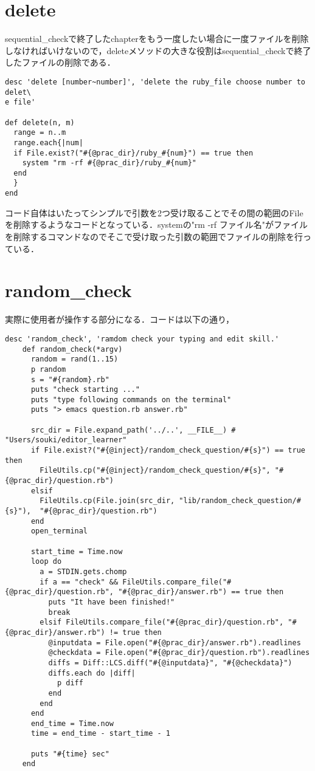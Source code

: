     \section{delete}\label{delete}

sequential\_checkで終了したchapterをもう一度したい場合に一度ファイルを削除しなければいけないので，deleteメソッドの大きな役割はsequential\_checkで終了したファイルの削除である．

\begin{verbatim}
desc 'delete [number~number]', 'delete the ruby_file choose number to delet\
e file'

def delete(n, m)
  range = n..m
  range.each{|num|
  if File.exist?("#{@prac_dir}/ruby_#{num}") == true then
    system "rm -rf #{@prac_dir}/ruby_#{num}"
  end
  }
end
\end{verbatim}

コード自体はいたってシンプルで引数を2つ受け取ることでその間の範囲のFileを削除するようなコードとなっている．systemの"rm
-rf
ファイル名"がファイルを削除するコマンドなのでそこで受け取った引数の範囲でファイルの削除を行っている．

    \section{random\_check}\label{random_check}

実際に使用者が操作する部分になる．コードは以下の通り，

\begin{verbatim}
desc 'random_check', 'ramdom check your typing and edit skill.'
    def random_check(*argv)
      random = rand(1..15)
      p random
      s = "#{random}.rb"
      puts "check starting ..."
      puts "type following commands on the terminal"
      puts "> emacs question.rb answer.rb"

      src_dir = File.expand_path('../..', __FILE__) # "Users/souki/editor_learner"
      if File.exist?("#{@inject}/random_check_question/#{s}") == true then
        FileUtils.cp("#{@inject}/random_check_question/#{s}", "#{@prac_dir}/question.rb")
      elsif
        FileUtils.cp(File.join(src_dir, "lib/random_check_question/#{s}"),  "#{@prac_dir}/question.rb")
      end
      open_terminal
      
      start_time = Time.now
      loop do
        a = STDIN.gets.chomp
        if a == "check" && FileUtils.compare_file("#{@prac_dir}/question.rb", "#{@prac_dir}/answer.rb") == true then
          puts "It have been finished!"
          break
        elsif FileUtils.compare_file("#{@prac_dir}/question.rb", "#{@prac_dir}/answer.rb") != true then
          @inputdata = File.open("#{@prac_dir}/answer.rb").readlines
          @checkdata = File.open("#{@prac_dir}/question.rb").readlines
          diffs = Diff::LCS.diff("#{@inputdata}", "#{@checkdata}")
          diffs.each do |diff|
            p diff
          end
        end
      end
      end_time = Time.now
      time = end_time - start_time - 1
      
      puts "#{time} sec"
    end
\end{verbatim}

